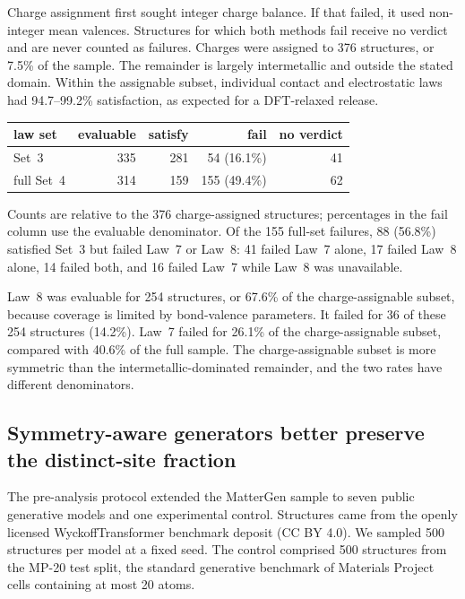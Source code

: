 Charge assignment first sought integer charge balance. If that failed, it used
non-integer mean valences. Structures for which both methods fail receive no
verdict and are never counted as failures. Charges were assigned to 376 structures,
or 7.5\% of the sample. The remainder is largely intermetallic and outside the
stated domain. Within the assignable subset, individual contact and electrostatic
laws had 94.7--99.2\% satisfaction, as expected for a DFT-relaxed release.

\begin{center}
\begin{tabular}{lrrrr}
\hline
law set & evaluable & satisfy & fail & no verdict \\
\hline
Set~3 & 335 & 281 & 54 (16.1\%) & 41 \\
full Set~4 & 314 & 159 & 155 (49.4\%) & 62 \\
\hline
\end{tabular}
\end{center}

Counts are relative to the 376 charge-assigned structures; percentages in the fail column
use the evaluable denominator. Of the 155 full-set failures,
88 (56.8\%) satisfied Set~3 but failed Law~7 or Law~8: 41 failed Law~7 alone,
17 failed Law~8 alone, 14 failed both, and 16 failed Law~7 while Law~8 was
unavailable.

Law~8 was evaluable for 254 structures, or 67.6\% of the charge-assignable
subset, because coverage is limited by bond-valence parameters. It failed for 36
of these 254 structures (14.2\%). Law~7 failed for 26.1\% of the
charge-assignable subset, compared with 40.6\% of the full sample. The
charge-assignable subset is more symmetric than the intermetallic-dominated
remainder, and the two rates have different denominators.

\subsection{Symmetry-aware generators better preserve the distinct-site fraction}

The pre-analysis protocol extended the MatterGen sample to seven public
generative models and one experimental control. Structures came from the openly
licensed WyckoffTransformer benchmark deposit (CC BY 4.0). We sampled 500
structures per model at a fixed seed. The control comprised 500 structures from
the MP-20 test split, the standard generative benchmark of Materials Project
cells containing at most 20 atoms.

